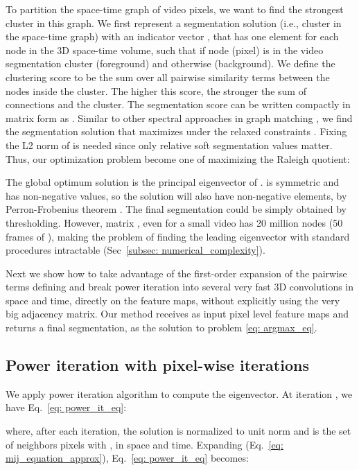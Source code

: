 \documentclass{article}
\begin{document}
To partition the space-time graph of video pixels, we want to find the strongest cluster in this graph. We first represent a segmentation solution (i.e., cluster in the space-time graph) with an indicator vector , that has one element for each node in the 3D space-time volume, such that  if node (pixel)  is in the video segmentation cluster (foreground) and   otherwise (background). We define the clustering score to be the sum over all pairwise similarity terms  between the nodes inside the cluster. The higher this score, the stronger the sum of connections and the cluster. The segmentation score can be written compactly in matrix form as . Similar to other spectral approaches in graph matching \cite{marius_iccv2005}, we find the segmentation solution  that maximizes  under the relaxed constraints . Fixing the L2 norm of  is needed since only relative soft segmentation values matter. Thus, our optimization problem become one of maximizing the Raleigh quotient:



The global optimum solution is the principal eigenvector of .  is symmetric and has non-negative values, so the solution will also have non-negative elements, by Perron-Frobenius theorem \cite{frobenius}. The final segmentation could be simply obtained by thresholding. However, matrix , even for a small video has 20 million nodes (50 frames of ), making the problem of finding the leading eigenvector with standard procedures intractable (Sec~\ref{subsec: numerical_complexity}).

Next we show how to take advantage of the first-order expansion of the pairwise terms defining  and break power iteration into several very fast 3D convolutions in space and time, directly on the feature maps, without explicitly using the very big adjacency matrix. Our method receives as input pixel level feature maps and returns a final segmentation, as the solution  to problem \ref{eq: argmax_eq}.


\subsection{Power iteration with pixel-wise iterations}
We apply power iteration algorithm to compute the eigenvector. At iteration , we have Eq.~\ref{eq: power_it_eq}:

where, after each iteration, the solution is normalized to unit norm and  is the set of neighbors pixels with , in space and time. Expanding  (Eq.~\ref{eq: mij_equation_approx}), Eq.~\ref{eq: power_it_eq} becomes:
\end{document}
